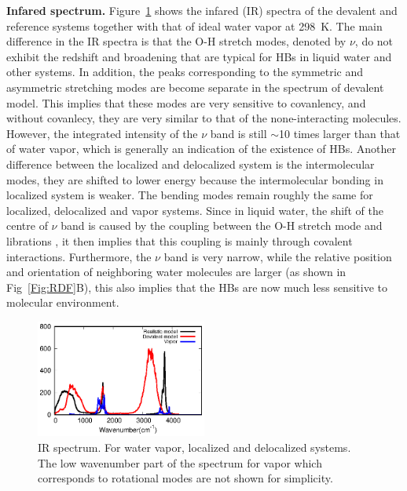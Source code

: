 \documentclass[aps,prl,reprint,amsmath,amssymb]{revtex4-1}
\begin{document}
\textbf{Infared spectrum.} Figure~\ref{Fig:IR} shows the infared (IR) spectra of the devalent and reference systems together with that of ideal water vapor at 298~K. 
The main difference in the IR spectra is that the O-H stretch modes, denoted by $\nu$, do not exhibit the redshift and broadening that are typical for HBs in liquid water and other systems.
In addition, the peaks corresponding to the symmetric and asymmetric stretching modes are become separate in the spectrum of devalent model. 
This implies that these modes are very sensitive to covanlency, and without covanlecy, they are very similar to that of the none-interacting molecules. 
\new However, the integrated intensity of the $\nu$ band is still $\sim$10 times larger than that of water vapor, which is generally an indication of the existence of HBs. \old 
Another difference between the localized and delocalized system is the intermolecular modes, they are shifted to lower energy because the intermolecular bonding in localized system is weaker. 
The bending modes remain roughly the same for localized, delocalized and vapor systems. 
Since in liquid water, the shift of the centre of $\nu$ band is caused by the coupling between the O-H stretch mode and librations \cite{marechal2006hydrogen}, it then implies that this coupling is mainly through covalent interactions. 
Furthermore, the $\nu$ band is very narrow, while the relative position and orientation of neighboring water molecules are larger (as shown in Fig~\ref{Fig:RDF}B), this also implies that the HBs are now much less sensitive to molecular environment.

\begin{figure}
\centering
\includegraphics[width=0.5\textwidth]{new_ir}
\caption{IR spectrum. 
For water vapor, localized and delocalized systems. 
The low wavenumber part of the spectrum for vapor which corresponds to rotational modes are not shown for simplicity. 
} \label{Fig:IR}
\end{figure}
\end{document}
